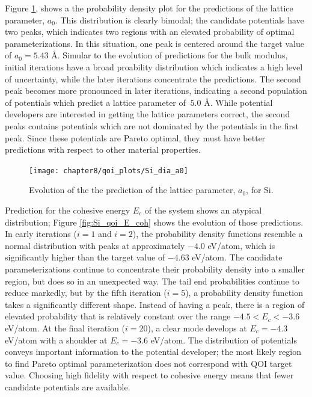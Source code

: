 Figure \ref{fig:Si_qoi_a0}, shows a the probability density plot for the predictions of the lattice parameter, $a_0$.  This distribution is clearly bimodal; the candidate potentials have two peaks, which indicates two regions with an elevated probability of optimal parameterizations.  In this situation, one peak is centered around the target value of $a_0=5.43$ \AA.  Simular to the evolution of predictions for the bulk modulus, initial iterations have a broad proability distribution which indicates a high level of uncertainty, while the later iterations concentrate the predictions. The second peak becomes more pronounced in later iterations, indicating a second population of potentials which predict a lattice parameter of $~5.0$ \AA.  While potential developers are interested in getting the lattice parameters correct, the second peaks contains potentials which are not dominated by the potentials in the first peak.  Since these potentials are Pareto optimal, they must have better predictions with respect to other material properties.

\begin{figure}[h]
	\centering
	\texttt{[image: chapter8/qoi\_plots/Si\_dia\_a0]}
	\caption{Evolution of the the prediction of the lattice parameter, $a_0$, for Si.}
	\label{fig:Si_qoi_a0}
\end{figure}

Prediction for the cohesive energy $E_c$ of the system shows an atypical distribution; Figure \ref{fig:Si_qoi_E_coh} shows the evolution of those predictions.  In early iterations ($i=1$ and $i=2$), the probability density functions resemble a normal distribution with peaks at approximately $-4.0$ eV/atom, which is significantly higher than the target value of $-4.63$ eV/atom.  The candidate parameterizations continue to concentrate their probability density into a smaller region, but does so in an unexpected way.  The tail end probabilities continue to reduce markedly, but by the fifth iteration ($i=5$), a probability density function takes a significantly different shape.  Instead of having a peak, there is a region of elevated probability that is relatively constant over the range $-4.5 < E_c < -3.6 $ eV/atom.  At the final iteration ($i=20$), a clear mode develops at $E_c=-4.3$ eV/atom with a shoulder at $E_c=-3.6$ eV/atom.
The distribution of potentials conveys important information to the potential developer; the most likely region to find Pareto optimal parameterization does not correspond with QOI target value.  Choosing high fidelity with respect to cohesive energy means that fewer candidate potentials are available.

